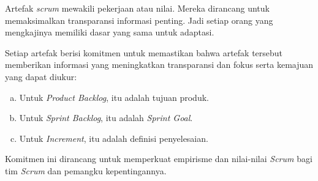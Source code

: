 	Artefak \emph{scrum} mewakili pekerjaan atau nilai. Mereka dirancang untuk memaksimalkan transparansi informasi penting. Jadi setiap orang yang mengkajinya memiliki dasar yang sama untuk adaptasi.

	Setiap artefak berisi komitmen untuk memastikan bahwa artefak tersebut memberikan informasi yang meningkatkan transparansi dan fokus serta kemajuan yang dapat diukur:
	
	\begin{enumerate}[a.]

		\item Untuk \emph{Product Backlog}, itu adalah tujuan produk.

		\item Untuk \emph{Sprint Backlog}, itu adalah \emph{Sprint Goal}.

		\item Untuk \emph{Increment}, itu adalah definisi penyelesaian.
		
	\end{enumerate}

	Komitmen ini dirancang untuk memperkuat empirisme dan nilai-nilai \emph{Scrum} bagi tim \emph{Scrum} dan pemangku kepentingannya.
	
